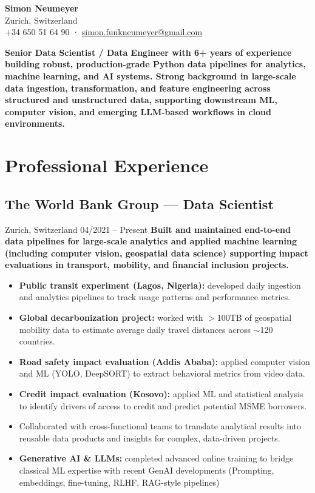 \documentclass[10.5pt,a4paper]{article}
\begin{document}
{\Large \textbf{Simon Neumeyer}} \\[-2pt]
Zurich, Switzerland \\
+34 650 51 64 90 ·
\href{mailto:simon.funkneumeyer@gmail.com}{simon.funkneumeyer@gmail.com}

\vspace{6pt}

\vspace{4pt}
\textbf{Senior Data Scientist / Data Engineer with 6+ years of experience building robust, production-grade
Python data pipelines for analytics, machine learning, and AI systems. Strong background in
large-scale data ingestion, transformation, and feature engineering across structured and
unstructured data, supporting downstream ML, computer vision, and emerging LLM-based
workflows in cloud environments.}

\vspace{1pt}
\section*{Professional Experience}

\subsection*{The World Bank Group --- Data Scientist}
Zurich, Switzerland \hfill 04/2021 -- Present
\newline
\textbf{Built and maintained end-to-end data pipelines for large-scale analytics and applied machine learning (including computer vision, geospatial data science) supporting impact evaluations in transport, mobility, and financial inclusion projects.}
\begin{itemize}
    \item \textbf{Public transit experiment (Lagos, Nigeria):} developed daily ingestion and analytics pipelines to track usage patterns and performance metrics.
    \item \textbf{Global decarbonization project:} worked with $>$100TB of geospatial mobility data to estimate average daily travel distances across $\sim$120 countries.
    \item \textbf{Road safety impact evaluation (Addis Ababa):} applied computer vision and ML (YOLO, DeepSORT) to extract behavioral metrics from video data.
    \item \textbf{Credit impact evaluation (Kosovo):} applied ML and statistical analysis to identify drivers of access to credit and predict potential MSME borrowers.
    \item Collaborated with cross-functional teams to translate analytical results into reusable data products and insights for complex, data-driven projects.
\item \textbf{Generative AI \& LLMs:} completed advanced online training to bridge classical ML expertise with recent GenAI developments (Prompting, embeddings, fine-tuning, RLHF, RAG-style pipelines)

\end{itemize}
\end{document}
